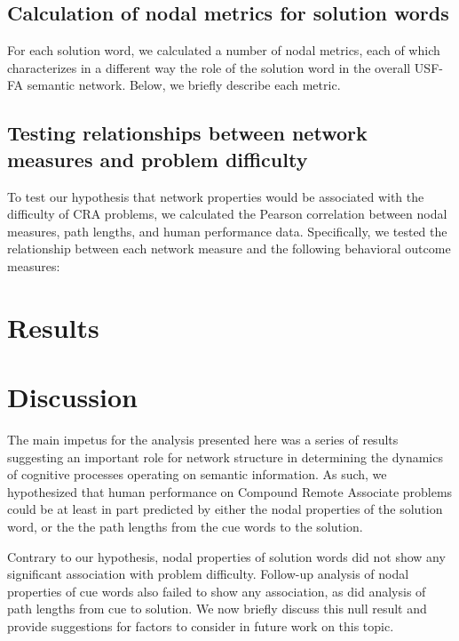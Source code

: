 \documentclass{article} %
\begin{document}
\subsection{Calculation of nodal metrics for solution words}
\label{path-metrics}

For each solution word, we calculated a number of nodal metrics, each of which characterizes in a different way the role of the solution word in the overall USF-FA semantic network. Below, we briefly describe each metric.

\subsection{Testing relationships between network measures and problem difficulty}

To test our hypothesis that network properties would be associated with the difficulty of CRA problems, we calculated the Pearson correlation between nodal measures, path lengths, and human performance data. Specifically, we tested the relationship between each network measure and the following behavioral outcome measures: 

\section{Results}
\label{results}




\section{Discussion}
\label{discussion}

The main impetus for the analysis presented here was a series of results suggesting an important role for network structure in determining the dynamics of cognitive processes operating on semantic information. As such, we hypothesized that human performance on Compound Remote Associate problems could be at least in part predicted by either the nodal properties of the solution word, or the the path lengths from the cue words to the solution.

Contrary to our hypothesis, nodal properties of solution words did not show any significant association with problem difficulty. Follow-up analysis of nodal properties of cue words also failed to show any association, as did analysis of path lengths from cue to solution. 
We now briefly discuss this null result and provide suggestions for factors to consider in future work on this topic.
\end{document}
